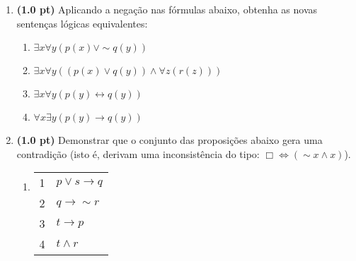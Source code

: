 \documentclass[11pt, a4paper,final]{article}
\begin{document}
\begin{enumerate}
\begin{comment}
1. $\sim (p \wedge q) $ \\
2. $ \sim r \vee q $ \\
3. $p \rightarrow r$ \\
\noindent\rule{0.5\textwidth}{1pt}\\
Isto é, esta sequência deduz ( $\vdash $, consiste
de um teorema) $\sim p$?
\end{comment}

\item {\bf (1.0 pt)} Aplicando a negação nas fórmulas abaixo, obtenha
 as novas  sentenças lógicas equivalentes:
\begin{enumerate}
\setlength{\itemsep}{-2pt}
 \item $ \exists x \forall y (p(x) \vee \sim q(y))$
 \item $ \exists x \forall y ((p(x) \vee q(y)) \wedge \forall z (r(z)))$
  \item  $ \exists x \forall y (p(y) \leftrightarrow q(y))$
  \item  $ \forall x \exists y (p(y) \rightarrow q(y))$
\end{enumerate}

\item {\bf (1.0 pt)} Demonstrar que o conjunto das proposições abaixo gera uma contradição (isto é,
derivam uma inconsistência do tipo: $\Box \Leftrightarrow (\sim x \wedge x)$).
\begin{enumerate}
\setlength{\itemsep}{-4pt}

\item \vskip 11pt
\begin{tabular}{ll}
    1 &  $ p \vee s \rightarrow q$ \\
    2 &  $q \rightarrow \sim r$ \\
    3 &  $t \rightarrow p$ \\
    4 &  $t \wedge r $
\end{tabular}


\end{enumerate}
\end{enumerate}
\end{document}
